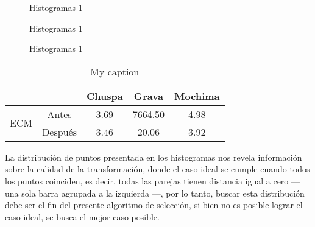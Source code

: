 \begin{figure}[h]
	\centering     %
	\hspace{1mm}%
	
	\caption[Histogramas 1]{Histogramas 1}
	\label{imagen:grid:0752-match}
\end{figure}

\begin{figure}[h]
	\centering     %
	\hspace{3mm}%
	
	\caption[Histogramas 1]{Histogramas 1}
	\label{imagen:grid:0752-hist}
\end{figure}
\begin{figure}[h]
	\centering     %
	\hspace{1mm}%
	
	\caption[Histogramas 1]{Histogramas 1}
	\label{imagen:grid:0752-align}
\end{figure}


\begin{table}[h]
	\centering
	\caption{My caption}
	\label{tabla:ECM}
	\begin{tabular}{@{}lcccc@{}}
		\toprule
		\multicolumn{2}{l}{}           			 & Chuspa  & Grava & Mochima \\ \midrule
		\multirow{2}{*}{ECM} &\hfill Antes \hfill\vline& 3.69    &7664.50& 4.98    \\
							& Después      \vline& 3.46    & 20.06 & 3.92    \\
							
		\bottomrule 
	\end{tabular}
\end{table}

La distribución de puntos presentada en los histogramas nos revela información sobre la calidad de la transformación, donde el caso ideal se cumple cuando todos los puntos coinciden, es decir, todas las parejas tienen distancia igual a cero --- una sola barra agrupada a la izquierda ---, por lo tanto, buscar esta distribución debe ser el fin del presente algoritmo de selección, si bien no es posible lograr el caso ideal, se busca el mejor caso posible. 


